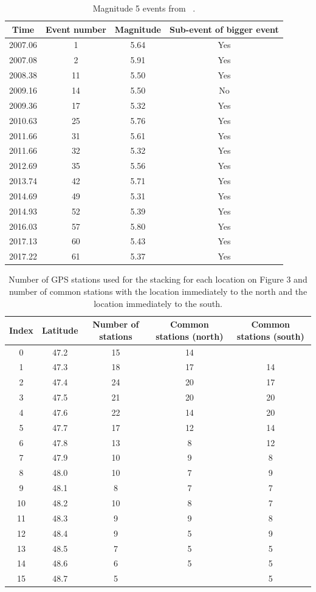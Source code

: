 \documentclass{article}
\begin{document}
 \begin{table}[hbt!]
 \caption{Magnitude 5 events from ~\citet{MIC_2019}.}
 \centering
 \begin{tabular}{c c c c}
 \hline
 Time & Event number & Magnitude & Sub-event of bigger event \\
 \hline
 2007.06 & 1 & 5.64 & Yes \\
 2007.08 & 2 & 5.91 & Yes \\
 2008.38 & 11 & 5.50 & Yes \\
 2009.16 & 14 & 5.50 & No \\
 2009.36 & 17 & 5.32 & Yes \\
 2010.63 & 25 & 5.76 & Yes \\
 2011.66 & 31 & 5.61 & Yes \\
 2011.66 & 32 & 5.32 & Yes \\
 2012.69 & 35 & 5.56 & Yes \\
 2013.74 & 42 & 5.71 & Yes \\
 2014.69 & 49 & 5.31 & Yes \\
 2014.93 & 52 & 5.39 & Yes \\
 2016.03 & 57 & 5.80 & Yes \\
 2017.13 & 60 & 5.43 & Yes \\
 2017.22 & 61 & 5.37 & Yes \\
 \hline
 \end{tabular}
 \end{table}

 \begin{table}[hbt!]
 \caption{Number of GPS stations used for the stacking for each location on Figure 3 and number of common stations with the location immediately to the north and the location immediately to the south.}
 \centering
 \begin{tabular}{c c c c c}
 \hline
 Index & Latitude & Number of stations & Common stations (north) & Common stations (south) \\
 \hline
0 & 47.2 & 15 & 14 & \\
1 & 47.3 & 18 & 17 & 14 \\
2 & 47.4 & 24 & 20 & 17 \\
3 & 47.5 & 21 & 20 & 20 \\
4 & 47.6 & 22 & 14 & 20 \\
5 & 47.7 & 17 & 12 & 14 \\
6 & 47.8 & 13 & 8 & 12 \\
7 & 47.9 & 10 & 9 & 8 \\
8 & 48.0 & 10 & 7 & 9 \\
9 & 48.1 & 8 & 7 & 7 \\
10 & 48.2 & 10 & 8 & 7 \\
11 & 48.3 & 9 & 9 & 8 \\
12 & 48.4 & 9 & 5 & 9 \\
13 & 48.5 & 7 & 5 & 5 \\
14 & 48.6 & 6 & 5 & 5 \\
15 & 48.7 & 5 & & 5 \\
 \hline
 \end{tabular}
 \end{table}
\end{document}
